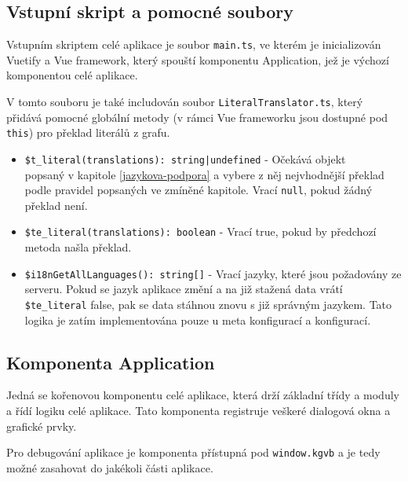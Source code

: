 \subsection{Vstupní skript a pomocné soubory}
Vstupním skriptem celé aplikace je soubor \texttt{main.ts}, ve kterém je inicializován Vuetify a Vue framework, který spouští komponentu Application, jež je výchozí komponentou celé aplikace.

V tomto souboru je také includován soubor \texttt{LiteralTranslator.ts}, který přidává pomocné globální metody (v rámci Vue frameworku jsou dostupné pod \texttt{this}) pro překlad literálů z grafu.

\begin{itemize}
  \item \texttt{\$t_literal(translations): string|undefined} - Očekává objekt \\popsaný v kapitole \ref{jazykova-podpora} a vybere z něj nejvhodnější překlad podle pravidel popsaných ve zmíněné kapitole. Vrací \texttt{null}, pokud žádný překlad není.

  \item \texttt{\$te_literal(translations): boolean} - Vrací true, pokud by předchozí metoda našla překlad.

  \item \texttt{\$i18nGetAllLanguages(): string[]} - Vrací jazyky, které jsou požadovány ze serveru. Pokud se jazyk aplikace změní a na již stažená data vrátí \texttt{\$te_literal} false, pak se data stáhnou znovu s již správným jazykem. Tato logika je zatím implementována pouze u meta konfigurací a konfigurací.
\end{itemize}

\subsection{Komponenta Application}\label{komponenta-application}
Jedná se kořenovou komponentu celé aplikace, která drží základní třídy a moduly a řídí logiku celé aplikace. Tato komponenta registruje veškeré dialogová okna a grafické prvky.

Pro debugování aplikace je komponenta přístupná pod \texttt{window.kgvb} a je tedy možné zasahovat do jakékoli části aplikace.

